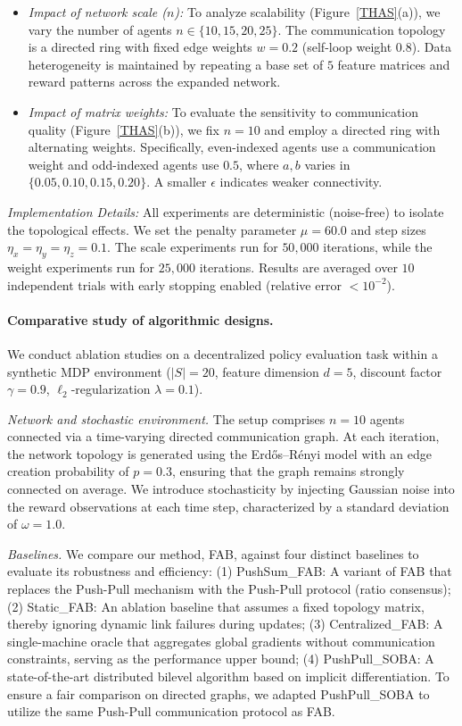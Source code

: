 \documentclass{article}
\theoremstyle{plain}
\theoremstyle{definition}
\theoremstyle{remark}
\begin{document}
\begin{itemize}
    \item \textit{Impact of network scale ($n$):} To analyze scalability (Figure~\ref{THAS}(a)), we vary the number of agents $n \in \{10, 15, 20, 25\}$. The communication topology is a directed ring with fixed edge weights $w=0.2$ (self-loop weight $0.8$). Data heterogeneity is maintained by repeating a base set of $5$ feature matrices and reward patterns across the expanded network.
    
    \item \textit{Impact of matrix weights:} To evaluate the sensitivity to communication quality (Figure~\ref{THAS}(b)), we fix $n=10$ and employ a directed ring with alternating weights. Specifically, even-indexed agents use a communication weight  and odd-indexed agents use $0.5$, where $a,b$ varies in $\{0.05, 0.10, 0.15, 0.20\}$. A smaller $\epsilon$ indicates weaker connectivity.
\end{itemize}

\textit{Implementation Details:} All experiments are deterministic (noise-free) to isolate the topological effects. We set the penalty parameter $\mu=60.0$ and step sizes $\eta_x=\eta_y=\eta_z=0.1$. The scale experiments run for $50,000$ iterations, while the weight experiments run for $25,000$ iterations. Results are averaged over $10$ independent trials with early stopping enabled (relative error $< 10^{-2}$).

\paragraph{Comparative study of algorithmic designs.}
We conduct ablation studies on a decentralized policy evaluation task within a synthetic MDP environment ($|S|=20$, feature dimension $d=5$, discount factor $\gamma=0.9$, $\ell_2$-regularization $\lambda=0.1$). 

\textit{Network and stochastic environment.} 
The setup comprises $n=10$ agents connected via a time-varying directed communication graph. At each iteration, the network topology is generated using the Erd\H{o}s--R\'enyi model with an edge creation probability of $p=0.3$, ensuring that the graph remains strongly connected on average.
We introduce stochasticity by injecting Gaussian noise into the reward observations at each time step, characterized by a standard deviation of $\omega=1.0$.

\textit{Baselines.} 
We compare our method, FAB, against four distinct baselines to evaluate its robustness and efficiency:
(1) PushSum\_FAB: A variant of FAB that replaces the Push-Pull mechanism with the Push-Pull protocol (ratio consensus);
(2) Static\_FAB: An ablation baseline that assumes a fixed topology matrix, thereby ignoring dynamic link failures during updates;
(3) Centralized\_FAB: A single-machine oracle that aggregates global gradients without communication constraints, serving as the performance upper bound;
(4) PushPull\_SOBA: A state-of-the-art distributed bilevel algorithm based on implicit differentiation. To ensure a fair comparison on directed graphs, we adapted PushPull\_SOBA to utilize the same Push-Pull communication protocol as FAB.
\end{document}
